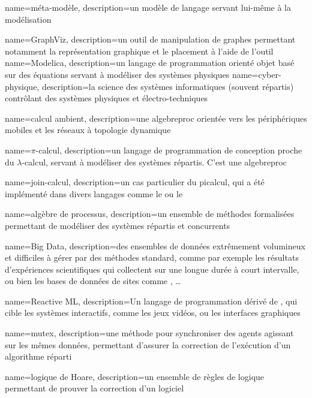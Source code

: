 {
	name={méta-modèle},
	description={un modèle de langage servant lui-même à la modélisation}	
}

{
	name=GraphViz, 
	description={un outil de manipulation de graphes permettant notamment la représentation graphique et le placement à l'aide de l'outil }
}
{
	name=Modelica, 
	description={un langage de programmation orienté objet basé sur des équations servant à modéliser des systèmes physiques}
}
{
	name=cyber-physique, 
	description={la science des systèmes informatiques (souvent répartis) contrôlant des systèmes physiques et électro-techniques}
}

{
	name={calcul ambient}, 
	description={une \gls{algebreproc} orientée vers les périphériques mobiles et les réseaux à topologie dynamique}
}

{
	name={$\pi$-calcul},
	description={un langage de programmation de conception proche du $\lambda$-calcul, servant à modéliser des systèmes répartis. C'est une \gls{algebreproc}}	
}

{
	name={join-calcul}, 
	description={un cas particulier du \gls{picalcul}, qui a été implémenté dans divers langages comme le  ou le }
}

{
	name={algèbre de processus},
	description={un ensemble de méthodes formalisées permettant de modéliser des systèmes répartis et concurrents}
}

{
	name={Big Data},
	description={des ensembles de données extrêmement volumineux et difficiles à gérer par des méthodes standard, comme par exemple les résultats d'expériences scientifiques qui collectent sur une longue durée à court intervalle, ou bien les bases de données de sites comme , \dots}
}

{
	name={Reactive ML},
	description={Un langage de programmation dérivé de , qui cible les systèmes interactifs, comme les jeux vidéos, ou les interfaces graphiques}	
}

{
	name=mutex,
	description={une méthode pour synchroniser des agents agissant sur les mêmes données, permettant d'assurer la correction de l'exécution d'un algorithme réparti}	
}

{
	name={logique de Hoare},
	description={un ensemble de règles de logique permettant de prouver la correction d'un logiciel}
}